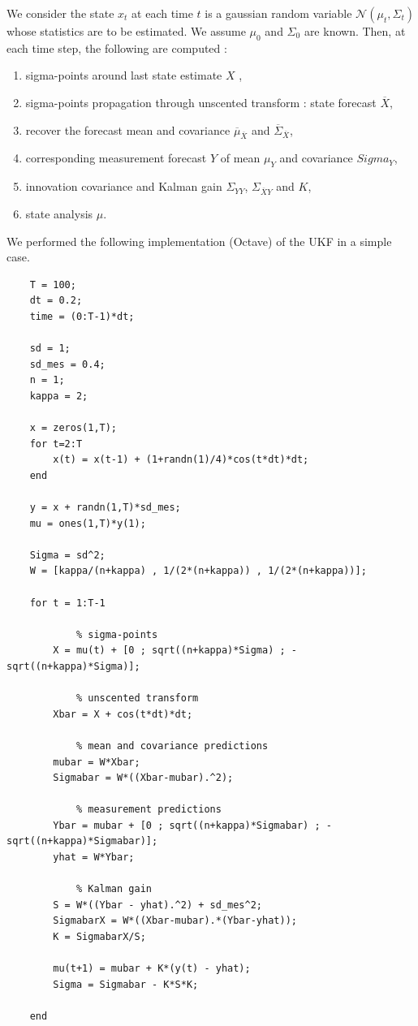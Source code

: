 \documentclass[a4paper]{article}
\newcounter{c}
\newcounter{d}
\newcounter{r}
\newcounter{e}
\begin{document}
We consider the state $x_t$ at each time $t$ is a gaussian random variable $\mathcal N\left(\mu_t,\Sigma_t\right)$ whose statistics are to be estimated. We assume $\mu_0$ and $\Sigma_0$ are known. Then, at each time step, the following are computed :

\begin{enumerate}
\item sigma-points around last state estimate $X$ ,
\item sigma-points propagation through unscented transform : state forecast $\overline X$,
\item recover the forecast mean and covariance $\overline\mu_{\overline X}$ and $\overline\Sigma_{\overline X}$,
\item corresponding measurement forecast $Y$ of mean $\mu_Y$ and covariance $Sigma_Y$,
\item innovation covariance and Kalman gain $\Sigma_{YY}$, $\Sigma_{\overline XY}$ and $K$,
\item state analysis $\mu$.
\end{enumerate}


We performed the following implementation (Octave) of the UKF in a simple case.


\begin{verbatim}
    T = 100;
    dt = 0.2;
    time = (0:T-1)*dt;
    
    sd = 1;
    sd_mes = 0.4;
    n = 1;
    kappa = 2;
    
    x = zeros(1,T);
    for t=2:T
        x(t) = x(t-1) + (1+randn(1)/4)*cos(t*dt)*dt;
    end
    
    y = x + randn(1,T)*sd_mes;
    mu = ones(1,T)*y(1);
    
    Sigma = sd^2;
    W = [kappa/(n+kappa) , 1/(2*(n+kappa)) , 1/(2*(n+kappa))];
    
    for t = 1:T-1
        
            % sigma-points
        X = mu(t) + [0 ; sqrt((n+kappa)*Sigma) ; -sqrt((n+kappa)*Sigma)];
   
            % unscented transform
        Xbar = X + cos(t*dt)*dt;
        
            % mean and covariance predictions
        mubar = W*Xbar;
        Sigmabar = W*((Xbar-mubar).^2);
            
            % measurement predictions
        Ybar = mubar + [0 ; sqrt((n+kappa)*Sigmabar) ; -sqrt((n+kappa)*Sigmabar)];
        yhat = W*Ybar;

            % Kalman gain
        S = W*((Ybar - yhat).^2) + sd_mes^2;
        SigmabarX = W*((Xbar-mubar).*(Ybar-yhat));
        K = SigmabarX/S;
        
        mu(t+1) = mubar + K*(y(t) - yhat);
        Sigma = Sigmabar - K*S*K;
        
    end
\end{verbatim}
\end{document}
